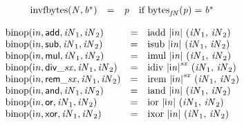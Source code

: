 $$
\begin{array}{@{}lcl@{}l@{}}
{\mathrm{invfbytes}}({\mathit{N}}, {{\mathit{b}}^\ast}) &=& {\mathit{p}} &\quad
  \mbox{if}~{{\mathrm{bytes}}}_{{{\mathit{f}}}{{\mathit{N}}}}({\mathit{p}}) = {{\mathit{b}}^\ast} \\
\end{array}
$$

\vspace{1ex}

\vspace{1ex}

$$
\begin{array}{@{}lcl@{}l@{}}
{\mathrm{binop}}({\mathsf{i}}{{\mathit{n}}}, \mathsf{add}, {\mathit{iN}}_{{1}}, {\mathit{iN}}_{{2}}) &=& {\mathrm{iadd}}~{|{\mathsf{i}}{{\mathit{n}}}|}~({\mathit{iN}}_{{1}},\, {\mathit{iN}}_{{2}}) &  \\
{\mathrm{binop}}({\mathsf{i}}{{\mathit{n}}}, \mathsf{sub}, {\mathit{iN}}_{{1}}, {\mathit{iN}}_{{2}}) &=& {\mathrm{isub}}~{|{\mathsf{i}}{{\mathit{n}}}|}~({\mathit{iN}}_{{1}},\, {\mathit{iN}}_{{2}}) &  \\
{\mathrm{binop}}({\mathsf{i}}{{\mathit{n}}}, \mathsf{mul}, {\mathit{iN}}_{{1}}, {\mathit{iN}}_{{2}}) &=& {\mathrm{imul}}~{|{\mathsf{i}}{{\mathit{n}}}|}~({\mathit{iN}}_{{1}},\, {\mathit{iN}}_{{2}}) &  \\
{\mathrm{binop}}({\mathsf{i}}{{\mathit{n}}}, {\mathsf{div\_}}{{\mathit{sx}}}, {\mathit{iN}}_{{1}}, {\mathit{iN}}_{{2}}) &=& {\mathrm{idiv}}~{{|{\mathsf{i}}{{\mathit{n}}}|}^{{\mathit{sx}}}}~({\mathit{iN}}_{{1}},\, {\mathit{iN}}_{{2}}) &  \\
{\mathrm{binop}}({\mathsf{i}}{{\mathit{n}}}, {\mathsf{rem\_}}{{\mathit{sx}}}, {\mathit{iN}}_{{1}}, {\mathit{iN}}_{{2}}) &=& {\mathrm{irem}}~{{|{\mathsf{i}}{{\mathit{n}}}|}^{{\mathit{sx}}}}~({\mathit{iN}}_{{1}},\, {\mathit{iN}}_{{2}}) &  \\
{\mathrm{binop}}({\mathsf{i}}{{\mathit{n}}}, \mathsf{and}, {\mathit{iN}}_{{1}}, {\mathit{iN}}_{{2}}) &=& {\mathrm{iand}}~{|{\mathsf{i}}{{\mathit{n}}}|}~({\mathit{iN}}_{{1}},\, {\mathit{iN}}_{{2}}) &  \\
{\mathrm{binop}}({\mathsf{i}}{{\mathit{n}}}, \mathsf{or}, {\mathit{iN}}_{{1}}, {\mathit{iN}}_{{2}}) &=& {\mathrm{ior}}~{|{\mathsf{i}}{{\mathit{n}}}|}~({\mathit{iN}}_{{1}},\, {\mathit{iN}}_{{2}}) &  \\
{\mathrm{binop}}({\mathsf{i}}{{\mathit{n}}}, \mathsf{xor}, {\mathit{iN}}_{{1}}, {\mathit{iN}}_{{2}}) &=& {\mathrm{ixor}}~{|{\mathsf{i}}{{\mathit{n}}}|}~({\mathit{iN}}_{{1}},\, {\mathit{iN}}_{{2}}) &  \\

\end{array}$$
